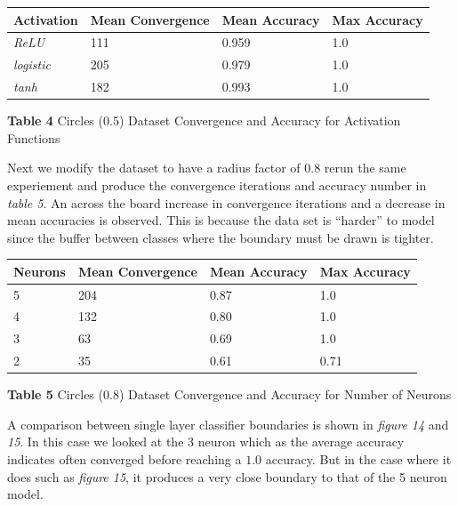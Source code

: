 \documentclass[11pt]{article}
\begin{document}
\begin{longtable}[]{@{}llll@{}}
\toprule
Activation & Mean Convergence & Mean Accuracy & Max Accuracy \\
\midrule
\endhead
\emph{ReLU} & 111 & 0.959 & 1.0 \\
\emph{logistic} & 205 & 0.979 & 1.0 \\
\emph{tanh} & 182 & 0.993 & 1.0 \\
\bottomrule
\end{longtable}

\textbf{Table 4} Circles (0.5) Dataset Convergence and Accuracy for
Activation Functions

Next we modify the dataset to have a radius factor of 0.8 rerun the same
experiement and produce the convergence iterations and accuracy number
in \emph{table 5}. An across the board increase in convergence
iterations and a decrease in mean accuracies is observed. This is
because the data set is ``harder'' to model since the buffer between
classes where the boundary must be drawn is tighter.

\begin{longtable}[]{@{}llll@{}}
\toprule
Neurons & Mean Convergence & Mean Accuracy & Max Accuracy \\
\midrule
\endhead
5 & 204 & 0.87 & 1.0 \\
4 & 132 & 0.80 & 1.0 \\
3 & 63 & 0.69 & 1.0 \\
2 & 35 & 0.61 & 0.71 \\
\bottomrule
\end{longtable}

\textbf{Table 5} Circles (0.8) Dataset Convergence and Accuracy for
Number of Neurons

A comparison between single layer classifier boundaries is shown in
\emph{figure 14} and \emph{15}. In this case we looked at the 3 neuron
which as the average accuracy indicates often converged before reaching
a \(1.0\) accuracy. But in the case where it does such as \emph{figure
15}, it produces a very close boundary to that of the 5 neuron model.
\end{document}
